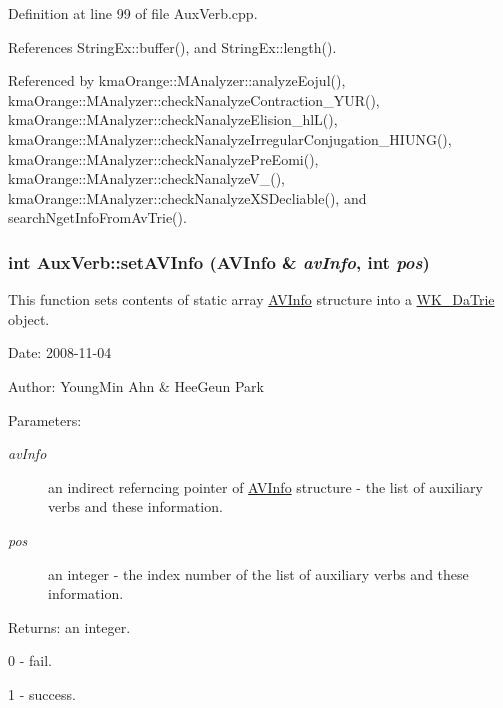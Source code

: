 Definition at line 99 of file AuxVerb.cpp.

References StringEx::buffer(), and StringEx::length().

Referenced by kmaOrange::MAnalyzer::analyzeEojul(), kmaOrange::MAnalyzer::checkNanalyzeContraction\_\-YUR(), kmaOrange::MAnalyzer::checkNanalyzeElision\_\-hlL(), kmaOrange::MAnalyzer::checkNanalyzeIrregularConjugation\_\-HIUNG(), kmaOrange::MAnalyzer::checkNanalyzePreEomi(), kmaOrange::MAnalyzer::checkNanalyzeV\_\-(), kmaOrange::MAnalyzer::checkNanalyzeXSDecliable(), and searchNgetInfoFromAvTrie().\hypertarget{classkmaOrange_1_1AuxVerb_bb9f09a6080340f66463ed5ac8ee9681}{
\subsubsection[{setAVInfo}]{\setlength{\rightskip}{0pt plus 5cm}int AuxVerb::setAVInfo ({\bf AVInfo} \& {\em avInfo}, \/  int {\em pos})}}
\label{classkmaOrange_1_1AuxVerb_bb9f09a6080340f66463ed5ac8ee9681}


This function sets contents of static array \hyperlink{structkmaOrange_1_1AVInfo}{AVInfo} structure into a \hyperlink{classkmaOrange_1_1WK__DaTrie}{WK\_\-DaTrie} object. 

\begin{Desc}
\item[Date:]2008-11-04 \end{Desc}
\begin{Desc}
\item[Author:]YoungMin Ahn \& HeeGeun Park \end{Desc}
\begin{Desc}
\item[Parameters:]
\begin{description}
\item[{\em avInfo}]an indirect referncing pointer of \hyperlink{structkmaOrange_1_1AVInfo}{AVInfo} structure - the list of auxiliary verbs and these information. \item[{\em pos}]an integer - the index number of the list of auxiliary verbs and these information. \end{description}
\end{Desc}
\begin{Desc}
\item[Returns:]an integer.\par
 0 - fail.\par
 1 - success. \end{Desc}



